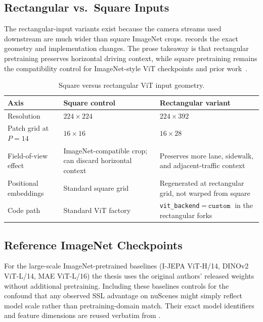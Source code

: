 \subsection{Rectangular vs.\ Square Inputs}
\label{sec:meth-ssl-rect}

The rectangular-input variants exist because the camera streams used downstream are much wider than square ImageNet crops.  records the exact geometry and implementation changes. The prose takeaway is that rectangular pretraining preserves horizontal driving context, while square pretraining remains the compatibility control for ImageNet-style ViT checkpoints and prior work~\cite{wang-drive-jepa}.

\begin{table}[ht]
\centering
\caption{Square versus rectangular ViT input geometry.}
\label{tab:meth-rect-inputs}
\small
\renewcommand{\arraystretch}{1.15}
\setlength{\tabcolsep}{6pt}
\begin{tabular}{@{}>{\raggedright\arraybackslash}p{3.4cm} >{\raggedright\arraybackslash}p{4.1cm} >{\raggedright\arraybackslash}p{4.6cm}@{}}
\toprule
\textbf{Axis} & \textbf{Square control} & \textbf{Rectangular variant} \\
\midrule
Resolution & $224 \times 224$ & $224 \times 392$ \\
Patch grid at $P{=}14$ & $16 \times 16$ & $16 \times 28$ \\
Field-of-view effect & ImageNet-compatible crop; can discard horizontal context & Preserves more lane, sidewalk, and adjacent-traffic context \\
Positional embeddings & Standard square grid & Regenerated at rectangular grid, not warped from square \\
Code path & Standard ViT factory & \texttt{vit\_backend}${=}\,\texttt{custom}$ in the rectangular forks \\
\bottomrule
\end{tabular}
\end{table}

\subsection{Reference ImageNet Checkpoints}
\label{sec:meth-ssl-imagenet}

For the large-scale ImageNet-pretrained baselines (I-JEPA ViT-H/14, DINOv2 ViT-L/14, MAE ViT-L/16) the thesis uses the original authors' released weights without additional pretraining. Including these baselines controls for the confound that any observed SSL advantage on nuScenes might simply reflect model scale rather than pretraining-domain match. Their exact model identifiers and feature dimensions are reused verbatim from .

